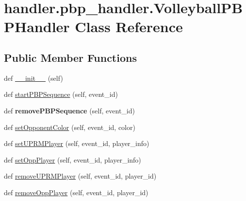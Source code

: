 \hypertarget{classhandler_1_1pbp__handler_1_1_volleyball_p_b_p_handler}{}\section{handler.\+pbp\+\_\+handler.\+Volleyball\+P\+B\+P\+Handler Class Reference}
\label{classhandler_1_1pbp__handler_1_1_volleyball_p_b_p_handler}
\subsection*{Public Member Functions}
\begin{DoxyCompactItemize}
\item 
def \hyperlink{classhandler_1_1pbp__handler_1_1_volleyball_p_b_p_handler_aaf8bf93acc9d40e5cc83d7e923032b17}{\+\_\+\+\_\+init\+\_\+\+\_\+} (self)
\item 
def \hyperlink{classhandler_1_1pbp__handler_1_1_volleyball_p_b_p_handler_a728bf0cbfec68f2590d87e1b51c80d17}{start\+P\+B\+P\+Sequence} (self, event\+\_\+id)
\item 
\mbox{\label{classhandler_1_1pbp__handler_1_1_volleyball_p_b_p_handler_aa7a063557f9cdc12d419d3077d77a813}} 
def {\bfseries remove\+P\+B\+P\+Sequence} (self, event\+\_\+id)
\item 
def \hyperlink{classhandler_1_1pbp__handler_1_1_volleyball_p_b_p_handler_a001188443e41ef56a85e3ca54e51869c}{set\+Opponent\+Color} (self, event\+\_\+id, color)
\item 
def \hyperlink{classhandler_1_1pbp__handler_1_1_volleyball_p_b_p_handler_aa7e3f8cd0284a25bcc7aca460f280a67}{set\+U\+P\+R\+M\+Player} (self, event\+\_\+id, player\+\_\+info)
\item 
def \hyperlink{classhandler_1_1pbp__handler_1_1_volleyball_p_b_p_handler_ab6f1cfbd5900c8264ebc3d56982d111d}{set\+Opp\+Player} (self, event\+\_\+id, player\+\_\+info)
\item 
def \hyperlink{classhandler_1_1pbp__handler_1_1_volleyball_p_b_p_handler_a4255f84db5a5c9f4ef7922a2b9d04c0a}{remove\+U\+P\+R\+M\+Player} (self, event\+\_\+id, player\+\_\+id)
\item 
def \hyperlink{classhandler_1_1pbp__handler_1_1_volleyball_p_b_p_handler_a62bd2008499c4b5f504dddc884ca01b2}{remove\+Opp\+Player} (self, event\+\_\+id, player\+\_\+id)
\item 

\end{DoxyCompactItemize}
